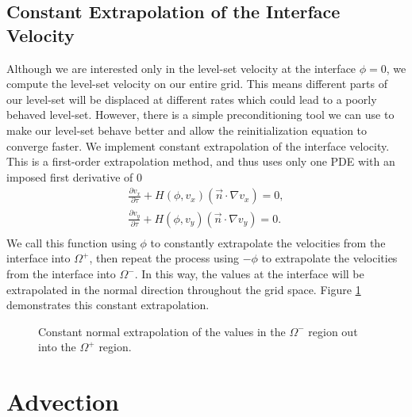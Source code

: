 \documentclass[oneside,12pt,final]{/Applications/TeX/packages/ucthesis-CA2012}
\begin{document}
\begin{mainmatter}
\section{Constant Extrapolation of the Interface Velocity}\label{section:constant_extrapolation}

Although we are interested only in the level-set velocity at the interface $\phi = 0$, we compute the level-set velocity on our entire grid. This means different parts of our level-set will be displaced at different rates which could lead to a poorly behaved level-set. However, there is a simple preconditioning tool we can use to make our level-set behave better and allow the reinitialization equation to converge faster. We implement constant extrapolation of the interface velocity. This is a first-order extrapolation method, and thus uses only one PDE with an imposed first derivative of 0
\begin{equation}  
\begin{aligned}
\frac{\partial v_x}{\partial \tau} + H(\phi,v_x)(\vec{n} \cdot \nabla v_x) = 0,\\
\frac{\partial v_y}{\partial \tau} + H(\phi,v_y)(\vec{n} \cdot \nabla v_y) = 0.\\
\end{aligned}
\end{equation}
We call this function using $\phi$ to constantly extrapolate the velocities from the interface into $\Omega^+$, then repeat the process using $-\phi$ to extrapolate the velocities from the interface into $\Omega^-$. In this way, the values at the interface will be extrapolated in the normal direction throughout the grid space. Figure \ref{fig:constant_extrapolation_1} demonstrates this constant extrapolation.
\begin{figure} [!h]
\centering
{} \quad
{}
  \caption[Constant Extrapolation Method]{Constant normal extrapolation of the values in the $\Omega^-$ region out into the $\Omega^+$ region.}
  \label{fig:constant_extrapolation_1}
\end{figure}


\chapter{Advection}


\end{mainmatter}
\end{document}
